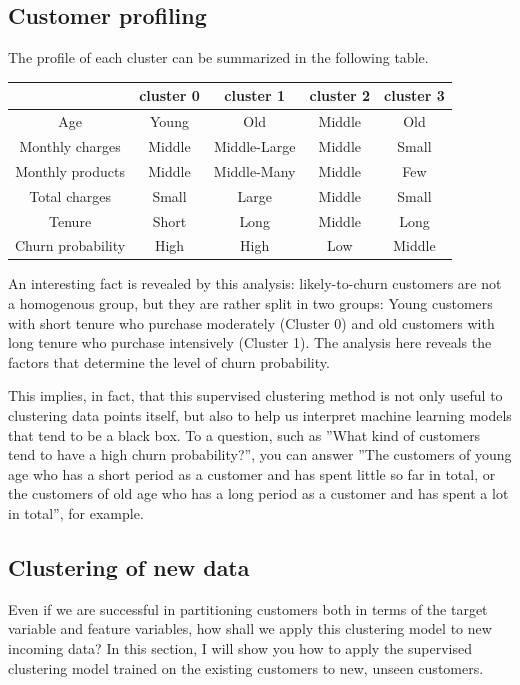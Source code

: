 \documentclass{article}
\begin{document}
\subsection{Customer profiling}
The profile of each cluster can be summarized in the following table.

\begin{center}
\begin{tabular}{ |c||c c c c| } 
\hline
& cluster 0 & cluster 1 & cluster 2 & cluster 3 \\ 
\hline
Age & Young & Old & Middle & Old \\ 
Monthly charges & Middle & Middle-Large & Middle & Small\\ 
Monthly products & Middle & Middle-Many & Middle & Few\\ 
Total charges & Small & Large & Middle & Small\\ 
Tenure & Short & Long & Middle & Long \\ 
\hline \hline
Churn probability & High & High & Low & Middle\\ 
\hline
\end{tabular}
\end{center}

An interesting fact is revealed by this analysis: likely-to-churn customers are not a homogenous group, but they are rather split in two groups: Young customers with short tenure who purchase moderately (Cluster 0) and old customers with long tenure who purchase intensively (Cluster 1). The analysis here reveals the factors that determine the level of churn probability.

This implies, in fact, that this supervised clustering method is not only useful to clustering data points itself, but also to help us interpret machine learning models that tend to be a black box. To a question, such as ''What kind of customers tend to have a high churn probability?'', you can answer ''The customers of young age who has a short period as a customer and has spent little so far in total, or the customers of old age who has a long period as a customer and has spent a lot in total'', for example.

\subsection{Clustering of new data}
Even if we are successful in partitioning customers both in terms of the target variable and feature variables, how shall we apply this clustering model to new incoming data? In this section, I will show you how to apply the supervised clustering model trained on the existing customers to new, unseen customers.
\end{document}
